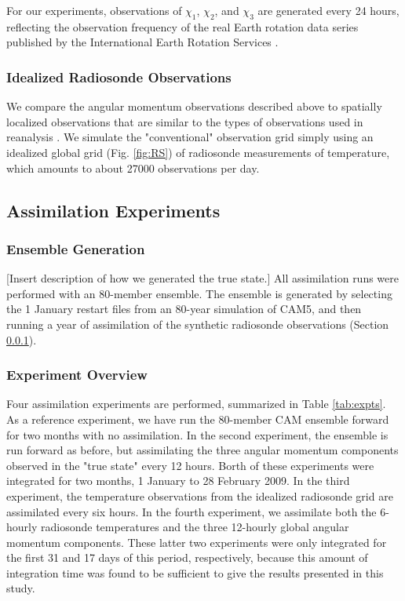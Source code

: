 For our experiments, observations of $\chi_1$, $\chi_2$, and $\chi_3$ are generated every 24 hours, reflecting the observation frequency of the real Earth rotation data series published by the International Earth Rotation Services \citep{iers}.  


\subsubsection{Idealized Radiosonde Observations}
\label{sec:radiosondes}

We compare the angular momentum observations described above to spatially localized observations that are similar to the types of observations used in  reanalysis \citep{Dee2005}.
We simulate the "conventional" observation grid simply using an idealized global grid (Fig. \ref{fig:RS}) of radiosonde measurements of temperature, which amounts to about 27000 observations per day.  





\subsection{Assimilation Experiments}
\label{sec:experiments}


\subsubsection{Ensemble Generation}

\textcolor{alert}{[Insert description of how we generated the true state.]}
All assimilation runs were performed with an 80-member ensemble.
The ensemble is generated by selecting the 1 January restart files from an 80-year simulation of CAM5, and then running a year of assimilation of the synthetic radiosonde observations (Section \ref{sec:radiosondes}).

\subsubsection{Experiment Overview}
Four assimilation experiments are performed, summarized in Table \ref{tab:expts}.
As a reference experiment, we have run the 80-member CAM ensemble forward for two months with no assimilation.
In the second experiment, the ensemble is run forward as before, but assimilating the three angular momentum components observed in the "true state" every 12 hours.
Borth of these experiments were integrated for two months, 1 January to 28 February 2009.  
In the third experiment, the temperature observations from the idealized radiosonde grid are assimilated every six hours. 
In the fourth experiment, we assimilate both the 6-hourly radiosonde temperatures and the three 12-hourly global angular momentum components.
These latter two experiments were only integrated for the first 31 and 17 days of this period, respectively, because this amount of integration time was found to be sufficient to give the results presented in this study.

